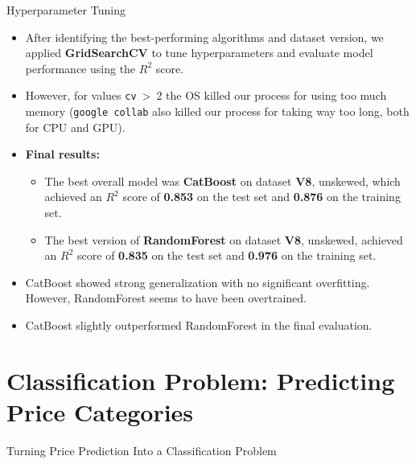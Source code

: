 \documentclass{beamer}
\begin{document}
\begin{frame}{Hyperparameter Tuning}
    \begin{itemize}
        \item After identifying the best-performing algorithms and dataset
                version, we applied \textbf{GridSearchCV} to tune
                hyperparameters and evaluate model performance using the $R^2$
                score.
        \item However, for values \texttt{cv}~\textgreater~2 the OS killed our
                process for using too much memory (\texttt{google collab} also
                killed our process for taking way too long, both for CPU and
                GPU).
        \item \textbf{Final results:}
        \begin{itemize}
            \item The best overall model was \textbf{CatBoost} on dataset
                    \textbf{V8}, unskewed, which achieved an $R^2$ score of
                    \textbf{0.853} on the test set and \textbf{0.876} on the
                    training set.
            \item The best version of \textbf{RandomForest} on dataset
                    \textbf{V8}, unskewed, achieved an $R^2$ score of
                    \textbf{0.835} on the test set and \textbf{0.976} on the
                    training set.
        \end{itemize}
        \item CatBoost showed strong generalization with no significant
                overfitting. However, RandomForest seems to have been
                overtrained.
        \item CatBoost slightly outperformed RandomForest in the final
                evaluation.
    \end{itemize}
\end{frame}

\section{Classification Problem: Predicting Price Categories}
\begin{frame}
        \centering
        \Huge
        Turning Price Prediction Into a Classification Problem
\end{frame}
\end{document}
